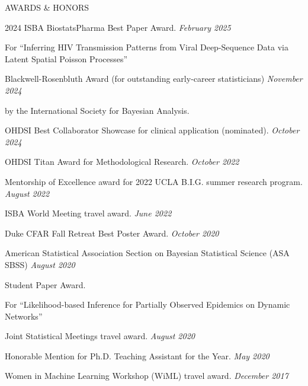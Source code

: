 \documentclass{resume} %
\begin{document}
\begin{rSection}{AWARDS \& HONORS}
	
2024 ISBA BiostatsPharma Best Paper Award. \hfill {\em February 2025}

\vspace{-0.1in}
{\footnotesize For ``Inferring HIV Transmission Patterns from Viral Deep-Sequence Data via Latent Spatial Poisson Processes''}

Blackwell-Rosenbluth Award (for outstanding early-career statisticians) \hfill {\em November 2024}

\vspace{-0.1in}
by the International Society for Bayesian Analysis. 

	
OHDSI Best Collaborator Showcase for clinical application (nominated).
\hfill {\em October 2024}

OHDSI Titan Award for Methodological Research. 
\hfill {\em October 2022}

Mentorship of Excellence award for 2022 UCLA B.I.G. summer research program. \hfill {\em August 2022}

ISBA World Meeting travel award.
\hfill {\em June 2022}

Duke CFAR Fall Retreat Best Poster Award. 
\hfill {\em October 2020}

American Statistical Association Section on Bayesian Statistical Science (ASA SBSS)
\hfill {\em August 2020}

\vspace{-0.1in}
Student Paper Award. 

\vspace{-0.1in}
{\footnotesize For ``Likelihood-based Inference for Partially Observed Epidemics on Dynamic Networks''}

Joint Statistical Meetings travel award. \hfill {\em August 2020}

Honorable Mention for Ph.D. Teaching Assistant for the Year. 
\hfill {\em May 2020}

Women in Machine Learning Workshop (WiML) travel award. \hfill {\em December 2017}

\end{rSection}
\end{document}
